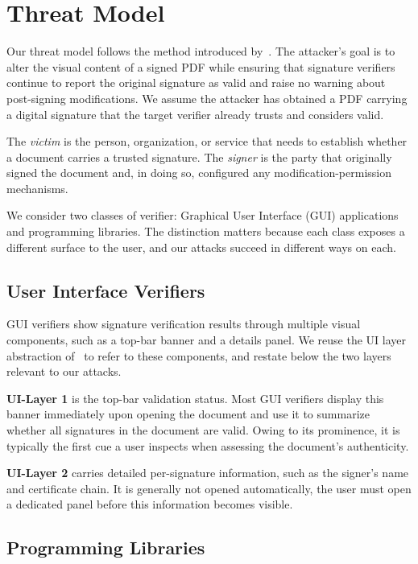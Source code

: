 \documentclass[12pt]{article}
\begin{document}
\section{Threat Model} \label{sec:threat-model}

Our threat model follows the method introduced by~\cite{one-trillion-dollar-refund}. The attacker's goal is to alter the visual content of a signed PDF while ensuring that signature verifiers continue to report the original signature as valid and raise no warning about post-signing modifications. We assume the attacker has obtained a PDF carrying a digital signature that the target verifier already trusts and considers valid.

The \emph{victim} is the person, organization, or service that needs to establish whether a document carries a trusted signature. The \emph{signer} is the party that originally signed the document and, in doing so, configured any modification-permission mechanisms.

We consider two classes of verifier: Graphical User Interface (GUI) applications and programming libraries. The distinction matters because each class exposes a different surface to the user, and our attacks succeed in different ways on each.

\subsection{User Interface Verifiers}

GUI verifiers show signature verification results through multiple visual components, such as a top-bar banner and a details panel. We reuse the UI layer abstraction of~\cite{one-trillion-dollar-refund} to refer to these components, and restate below the two layers relevant to our attacks.

\textbf{UI-Layer 1} is the top-bar validation status. Most GUI verifiers display this banner immediately upon opening the document and use it to summarize whether all signatures in the document are valid. Owing to its prominence, it is typically the first cue a user inspects when assessing the document's authenticity.

\textbf{UI-Layer 2} carries detailed per-signature information, such as the signer's name and certificate chain. It is generally not opened automatically, the user must open a dedicated panel before this information becomes visible.

\subsection{Programming Libraries}
\end{document}
